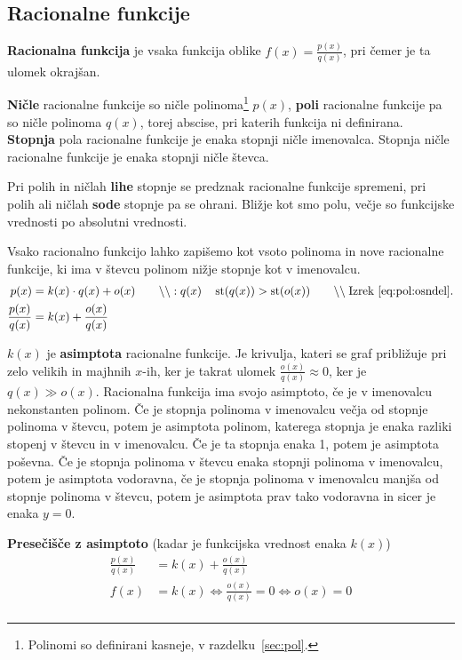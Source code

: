 \documentclass[a4paper,oneside,12pt,fleqn]{article}
\newcommand\krat\cdot
\newcommand{\comment}[1]{\ensuremath{\qquad\backslash\backslash\;}\textnormal{#1}}
\newcommand{\st}{\ensuremath{\operatorname{st}}} %
\renewcommand\iff\Leftrightarrow
\numberwithin{equation}{section}
\begin{document}
\subsection{Racionalne funkcije}
\label{sec:fun:rac}
\textbf{Racionalna funkcija} je vsaka funkcija oblike $f(x) = \frac{p(x)}{q(x)}$, pri čemer je ta
ulomek okrajšan.

\textbf{Ničle} racionalne funkcije so ničle polinoma\footnote{Polinomi so definirani kasneje, v
razdelku~\ref{sec:pol}.} $p(x)$, \textbf{poli} racionalne funkcije pa so ničle
polinoma $q(x)$, torej abscise, pri katerih funkcija ni definirana. \textbf{Stopnja} pola racionalne funkcije je enaka stopnji ničle
imenovalca. Stopnja ničle racionalne funkcije je enaka stopnji ničle števca.

Pri polih in ničlah \textbf{lihe} stopnje se predznak racionalne funkcije spremeni, pri polih ali
ničlah \textbf{sode} stopnje pa se ohrani. Bližje kot smo polu, večje so funkcijske
vrednosti po absolutni vrednosti.

Vsako racionalno funkcijo lahko zapišemo kot vsoto polinoma in nove racionalne funkcije,
ki ima v števcu polinom nižje stopnje kot v imenovalcu.
\begin{align}
  p(x) &= k(x) \krat q(x) + o(x) \comment{$:q(x)$}  \quad \st(q(x)) > \st(o(x))
  \comment{Izrek~\eqref{eq:pol:osndel}.} \nonumber \\
  \frac{p(x)}{q(x)} &= k(x) + \frac{o(x)}{q(x)} \label{eq:rac:del}
\end{align}

$k(x)$ je \textbf{asimptota} racionalne funkcije. Je krivulja, kateri se graf približuje pri zelo
velikih in majhnih $x$-ih, ker je takrat ulomek $\frac{o(x)}{q(x)} \approx 0$, ker je $q(x)
\gg o(x)$. Racionalna funkcija ima svojo asimptoto, če je v imenovalcu nekonstanten polinom.
Če je stopnja polinoma v imenovalcu večja od stopnje polinoma v števcu, potem je asimptota polinom,
katerega stopnja je enaka razliki stopenj v števcu in v imenovalcu. Če je ta stopnja enaka 1, potem
je asimptota poševna. Če je stopnja polinoma v števcu
enaka stopnji polinoma v imenovalcu, potem je asimptota vodoravna, če je stopnja polinoma v
imenovalcu manjša od stopnje polinoma v števcu, potem je asimptota prav tako vodoravna in sicer je
enaka $y = 0$.

\textbf{Presečišče z asimptoto} (kadar je funkcijska vrednost enaka $k(x)$)
\begin{align*}
    \frac{p(x)}{q(x)} &= k(x) + \frac{o(x)}{q(x)} \\
    f(x) &= k(x) \iff \frac{o(x)}{q(x)} = 0 \iff o(x) = 0 \\
\end{align*}
\end{document}
